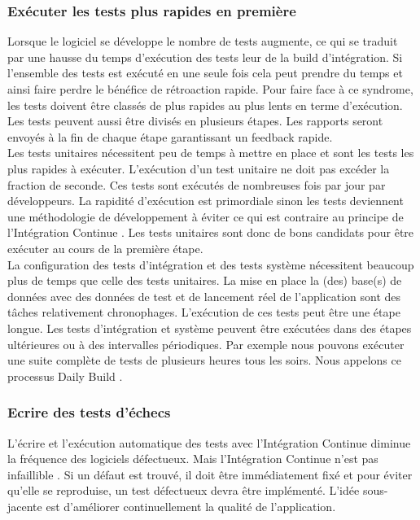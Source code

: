 \documentclass{report}
\begin{document}
        \subsubsection{Exécuter les tests plus rapides en première}
        Lorsque le logiciel se développe le nombre de tests augmente, ce qui se traduit par une hausse du temps d’exécution des tests leur de la build d’intégration. Si l’ensemble des tests est exécuté en une seule fois cela peut prendre du temps et ainsi faire perdre le bénéfice de rétroaction rapide. Pour faire face à ce syndrome, les tests doivent être classés de plus rapides au plus lents en terme d’exécution. Les tests peuvent aussi être divisés en plusieurs étapes. Les rapports seront envoyés à la fin de chaque étape garantissant un feedback rapide.\\

        Les tests unitaires nécessitent peu de temps à mettre en place et sont les tests les plus rapides à exécuter. L’exécution d’un test unitaire ne doit pas excéder la fraction de seconde. Ces tests sont exécutés de nombreuses fois par jour par développeurs. La rapidité d’exécution est primordiale sinon les tests deviennent une méthodologie de développement à éviter ce qui est contraire au principe de l’Intégration Continue \cite{Duv07}. Les tests unitaires sont donc de bons candidats pour être exécuter au cours de la première étape.\\

        La configuration des tests d'intégration et des tests système nécessitent beaucoup plus de temps que celle des tests unitaires. La mise en place la (des) base(s) de données avec des données de test et de lancement réel de l’application sont des tâches relativement chronophages. L’exécution de ces tests peut être une étape longue. Les tests d’intégration et système peuvent être exécutées dans des étapes ultérieures ou à des intervalles périodiques. Par exemple nous pouvons exécuter une suite complète de tests de plusieurs heures tous les soirs. Nous appelons ce processus Daily Build \cite{McC96}.

        \subsubsection{Ecrire des tests d’échecs}
        L’écrire et l’exécution automatique des tests avec l’Intégration Continue diminue la fréquence des logiciels défectueux. Mais l’Intégration Continue n’est pas infaillible \cite{Duv07}. Si un défaut est trouvé, il doit être immédiatement fixé et pour éviter qu’elle se reproduise, un test défectueux devra être implémenté. L'idée sous-jacente est d’améliorer continuellement la qualité de l’application.
\end{document}
